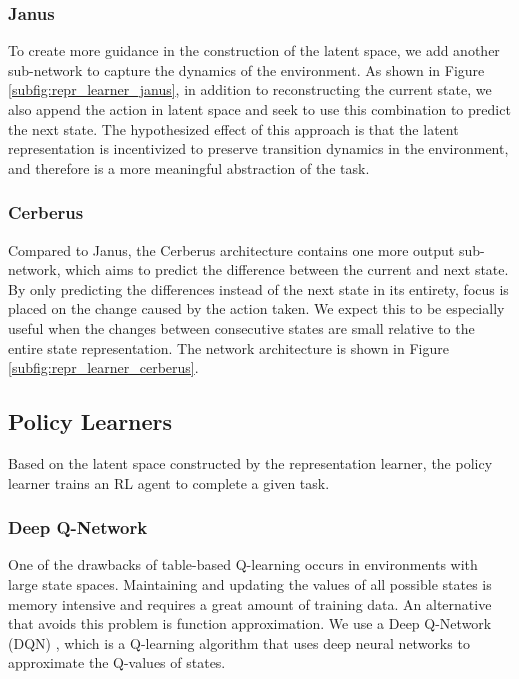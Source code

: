 \subsubsection{Janus}
To create more guidance in the construction of the latent space, we add another sub-network to capture the dynamics of the environment. 
As shown in Figure \ref{subfig:repr_learner_janus},
in addition to reconstructing the current state, we also append the action in latent space and seek to use this combination to predict the next state.
The hypothesized effect of this approach is that the latent representation is incentivized to preserve transition dynamics in the environment, and therefore is a more meaningful abstraction of the task.

\subsubsection{Cerberus}
Compared to Janus, the Cerberus architecture contains one more output sub-network, which aims to predict the difference between the current and next state. 
By only predicting the differences instead of the next state in its entirety, focus is placed on the change caused by the action taken.
We expect this to be especially useful when the changes between consecutive states are small relative to the entire state representation.
The network architecture is shown in Figure \ref{subfig:repr_learner_cerberus}.  

\subsection{Policy Learners}
Based on the latent space constructed by the representation learner, the policy learner trains an RL agent to complete a given task.


\subsubsection{Deep Q-Network}
One of the drawbacks of table-based Q-learning occurs in environments with large state spaces.
Maintaining and updating the values of all possible states is memory intensive and requires a great amount of training data.
An alternative that avoids this problem is function approximation. 
We use a Deep Q-Network (DQN) \citep{DQN}, which is a Q-learning algorithm that uses deep neural networks to approximate the Q-values of states.

